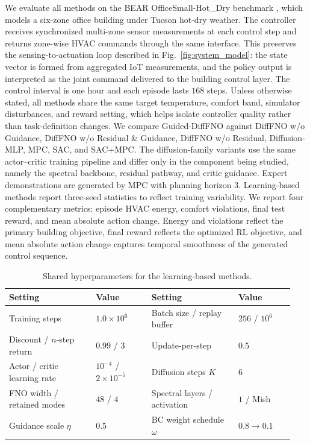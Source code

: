 \documentclass[conference]{IEEEtran}
\theoremstyle{nonumberplain}
\theoremstyle{plain}
\begin{document}
We evaluate all methods on the BEAR OfficeSmall-Hot\_Dry benchmark \cite{zhang2023bear}, which models a six-zone office building under Tucson hot-dry weather. The controller receives synchronized multi-zone sensor measurements at each control step and returns zone-wise HVAC commands through the same interface. This preserves the sensing-to-actuation loop described in Fig.~\ref{fig:system_model}: the state vector is formed from aggregated IoT measurements, and the policy output is interpreted as the joint command delivered to the building control layer. The control interval is one hour and each episode lasts $168$ steps. Unless otherwise stated, all methods share the same target temperature, comfort band, simulator disturbances, and reward setting, which helps isolate controller quality rather than task-definition changes.
We compare Guided-DiffFNO against DiffFNO w/o Guidance, DiffFNO w/o Residual \& Guidance, DiffFNO w/o Residual, Diffusion-MLP, MPC, SAC, and SAC+MPC. The diffusion-family variants use the same actor--critic training pipeline and differ only in the component being studied, namely the spectral backbone, residual pathway, and critic guidance. Expert demonstrations are generated by MPC with planning horizon $3$. Learning-based methods report three-seed statistics to reflect training variability.
We report four complementary metrics: episode HVAC energy, comfort violations, final test reward, and mean absolute action change. Energy and violations reflect the primary building objective, final reward reflects the optimized RL objective, and mean absolute action change captures temporal smoothness of the generated control sequence.

\begin{table}[t]
\centering
\caption{Shared hyperparameters for the learning-based methods.}
\label{tab:training_setup}
\scriptsize
\setlength{\tabcolsep}{3.5pt}
\renewcommand{\arraystretch}{1.04}
\begin{tabular}{>{\raggedright\arraybackslash}p{0.29\linewidth}>{\raggedright\arraybackslash}p{0.18\linewidth}>{\raggedright\arraybackslash}p{0.29\linewidth}>{\raggedright\arraybackslash}p{0.18\linewidth}}
\toprule
Setting & Value & Setting & Value \\
\midrule
Training steps & $1.0\times 10^6$ & Batch size / replay buffer & $256$ / $10^6$ \\
Discount / $n$-step return & $0.99$ / $3$ & Update-per-step & $0.5$ \\
Actor / critic learning rate & $10^{-4}$ / $2\times 10^{-5}$ & Diffusion steps $K$ & $6$ \\
FNO width / retained modes & $48$ / $4$ & Spectral layers / activation & $1$ / Mish \\
Guidance scale $\eta$ & $0.5$ & BC weight schedule $\omega$ & $0.8 \rightarrow 0.1$ \\
\bottomrule
\end{tabular}
\end{table}
\end{document}
